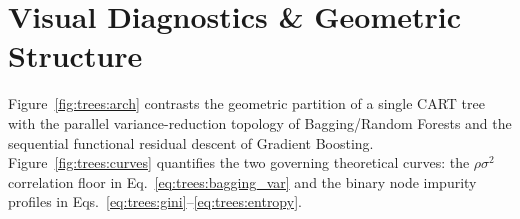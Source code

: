 \documentclass[../../../../master.tex]{subfiles}
\begin{document}
\section{Visual Diagnostics \& Geometric Structure}

Figure~\ref{fig:trees:arch} contrasts the geometric partition of a single CART tree with the parallel variance-reduction topology of Bagging/Random Forests and the sequential functional residual descent of Gradient Boosting. Figure~\ref{fig:trees:curves} quantifies the two governing theoretical curves: the $\rho\sigma^2$ correlation floor in Eq.~\eqref{eq:trees:bagging_var} and the binary node impurity profiles in Eqs.~\eqref{eq:trees:gini}--\eqref{eq:trees:entropy}.
\end{document}
